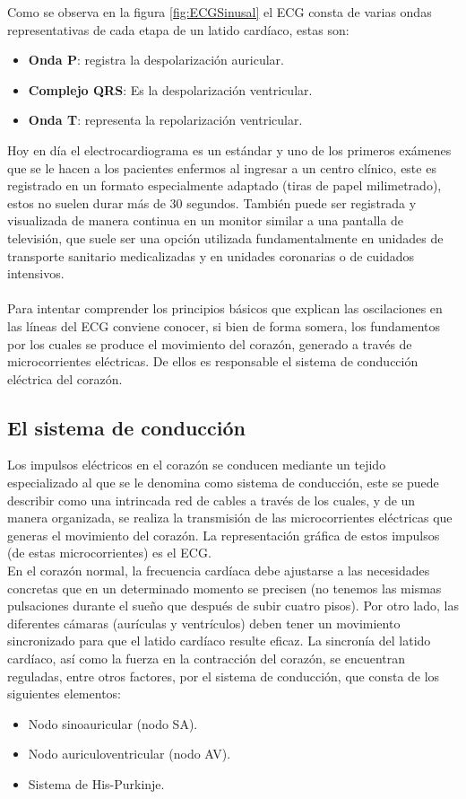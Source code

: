 \documentclass[spanish,11pt,letterpaper,oneside]{memoir}
\begin{document}
    Como se observa en la figura \ref{fig:ECGSinusal} el ECG consta de varias ondas representativas de cada etapa de un latido cardíaco, estas son: \\

	
	\begin{itemize}
		\item \textbf{Onda P}: registra la despolarización auricular.
		\item \textbf{Complejo QRS}: Es la despolarización ventricular.
		\item \textbf{Onda T}: representa la repolarización ventricular.
	\end{itemize}
	
	Hoy en día el electrocardiograma es un estándar y uno de los primeros exámenes que se le hacen a los pacientes enfermos al ingresar a un centro clínico, este es registrado en un formato especialmente adaptado (tiras de papel milimetrado), estos no suelen durar más de 30 segundos. También puede ser registrada y visualizada de manera continua en un monitor similar a una pantalla de televisión, que suele ser una opción utilizada fundamentalmente en unidades de transporte sanitario medicalizadas y en unidades coronarias o de cuidados intensivos. \\
	\\
	Para intentar comprender los principios básicos que explican las oscilaciones en las líneas del ECG conviene conocer, si bien de forma somera, los fundamentos por los cuales se produce el movimiento del corazón, generado a través de microcorrientes eléctricas. De ellos es responsable el sistema de conducción eléctrica del corazón.
	
	\subsection{El sistema de conducción}
	Los impulsos eléctricos en el corazón se conducen mediante un tejido especializado al que se le denomina como sistema de conducción, este se puede describir como una intrincada red de cables a través de los cuales, y de un manera organizada, se realiza la transmisión de las microcorrientes eléctricas que generas el movimiento del corazón. La representación gráfica de estos impulsos (de estas microcorrientes) es el ECG. \\
	En el corazón normal, la frecuencia cardíaca debe ajustarse a las necesidades concretas que en un determinado momento se precisen (no tenemos las mismas pulsaciones durante el sueño que después de subir cuatro pisos). Por otro lado, las diferentes cámaras (aurículas y ventrículos) deben tener un movimiento sincronizado para que el latido cardíaco resulte eficaz. La sincronía del latido cardíaco, así como la fuerza en la contracción del corazón, se encuentran reguladas, entre otros factores, por el sistema de conducción, que consta de los siguientes elementos: 
	\begin{itemize}
		\item Nodo sinoauricular (nodo SA).
		\item Nodo auriculoventricular (nodo AV).
		\item Sistema de His-Purkinje.
	\end{itemize}
	
\end{document}
